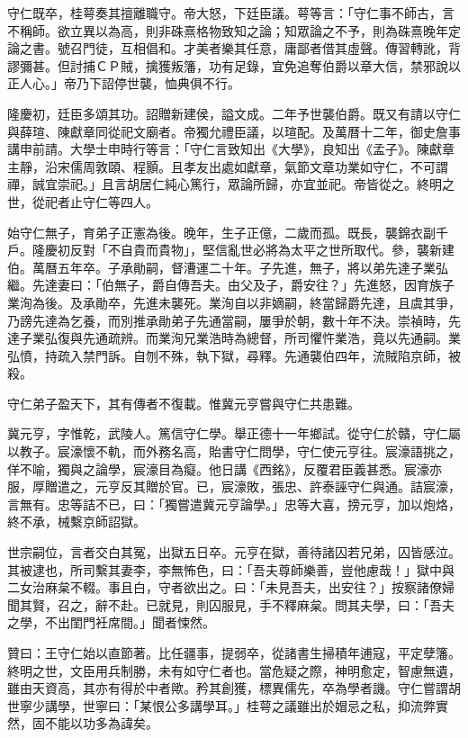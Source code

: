 \begin{pinyinscope}
守仁既卒，桂萼奏其擅離職守。帝大怒，下廷臣議。萼等言：「守仁事不師古，言不稱師。欲立異以為高，則非硃熹格物致知之論；知眾論之不予，則為硃熹晚年定論之書。號召門徒，互相倡和。才美者樂其任意，庸鄙者借其虛聲。傳習轉訛，背謬彌甚。但討捕ＣＰ賊，擒獲叛籓，功有足錄，宜免追奪伯爵以章大信，禁邪說以正人心。」帝乃下詔停世襲，恤典俱不行。

隆慶初，廷臣多頌其功。詔贈新建侯，謚文成。二年予世襲伯爵。既又有請以守仁與薛瑄、陳獻章同從祀文廟者。帝獨允禮臣議，以瑄配。及萬曆十二年，御史詹事講申前請。大學士申時行等言：「守仁言致知出《大學》，良知出《孟子》。陳獻章主靜，沿宋儒周敦頤、程顥。且孝友出處如獻章，氣節文章功業如守仁，不可謂禪，誠宜崇祀。」且言胡居仁純心篤行，眾論所歸，亦宜並祀。帝皆從之。終明之世，從祀者止守仁等四人。

始守仁無子，育弟子正憲為後。晚年，生子正億，二歲而孤。既長，襲錦衣副千戶。隆慶初反對「不自貴而貴物」，堅信亂世必將為太平之世所取代。參，襲新建伯。萬曆五年卒。子承勛嗣，督漕運二十年。子先進，無子，將以弟先達子業弘繼。先達妻曰：「伯無子，爵自傳吾夫。由父及子，爵安往？」先進怒，因育族子業洵為後。及承勛卒，先進未襲死。業洵自以非嫡嗣，終當歸爵先達，且虞其爭，乃謗先達為乞養，而別推承勛弟子先通當嗣，屢爭於朝，數十年不決。崇禎時，先達子業弘復與先通疏辨。而業洵兄業浩時為總督，所司懼忤業浩，竟以先通嗣。業弘憤，持疏入禁門訴。自刎不殊，執下獄，尋釋。先通襲伯四年，流賊陷京師，被殺。

守仁弟子盈天下，其有傳者不復載。惟冀元亨嘗與守仁共患難。

冀元亨，字惟乾，武陵人。篤信守仁學。舉正德十一年鄉試。從守仁於贛，守仁屬以教子。宸濠懷不軌，而外務名高，貽書守仁問學，守仁使元亨往。宸濠語挑之，佯不喻，獨與之論學，宸濠目為癡。他日講《西銘》，反覆君臣義甚悉。宸濠亦服，厚贈遣之，元亨反其贈於官。已，宸濠敗，張忠、許泰誣守仁與通。詰宸濠，言無有。忠等詰不已，曰：「獨嘗遣冀元亨論學。」忠等大喜，搒元亨，加以炮烙，終不承，械繫京師詔獄。

世宗嗣位，言者交白其冤，出獄五日卒。元亨在獄，善待諸囚若兄弟，囚皆感泣。其被逮也，所司繫其妻李，李無怖色，曰：「吾夫尊師樂善，豈他慮哉！」獄中與二女治麻枲不輟。事且白，守者欲出之。曰：「未見吾夫，出安往？」按察諸僚婦聞其賢，召之，辭不赴。已就見，則囚服見，手不釋麻枲。問其夫學，曰：「吾夫之學，不出閨門衽席間。」聞者悚然。

贊曰：王守仁始以直節著。比任疆事，提弱卒，從諸書生掃積年逋寇，平定孽籓。終明之世，文臣用兵制勝，未有如守仁者也。當危疑之際，神明愈定，智慮無遺，雖由天資高，其亦有得於中者歟。矜其創獲，標異儒先，卒為學者譏。守仁嘗謂胡世寧少講學，世寧曰：「某恨公多講學耳。」桂萼之議雖出於媢忌之私，抑流弊實然，固不能以功多為諱矣。


\end{pinyinscope}